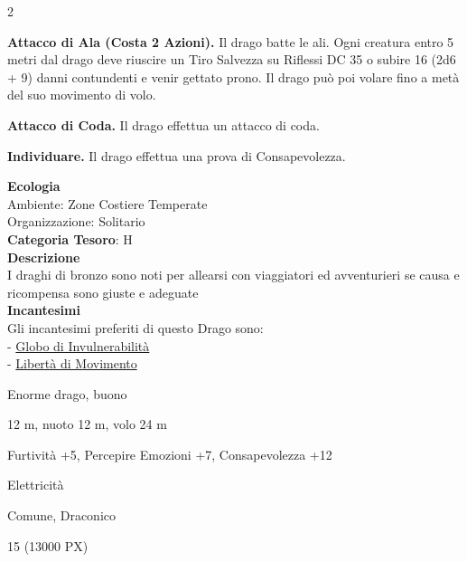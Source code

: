 \begin{multicols}{2}
{\textbf{Attacco di Ala (Costa 2 Azioni).} Il drago batte le ali. Ogni creatura entro 5 metri dal drago deve riuscire un Tiro Salvezza su Riflessi DC 35 o subire 16 (2d6 + 9) danni contundenti e venir gettato prono. Il drago può poi volare fino a metà del suo movimento di volo.

\textbf{Attacco di Coda.} Il drago effettua un attacco di coda.

\textbf{Individuare.} Il drago effettua una prova di Consapevolezza.

\textbf{Ecologia}\\
Ambiente: Zone Costiere Temperate\\
Organizzazione: Solitario\\
\textbf{Categoria Tesoro}: H\\
\textbf{Descrizione}\\
I draghi di bronzo sono noti per allearsi con viaggiatori ed avventurieri se causa e ricompensa sono giuste e adeguate\\
\textbf{Incantesimi}\\
Gli incantesimi preferiti di questo Drago sono:\\
- \hyperlink{Globo di Invulnerabilità}{Globo di Invulnerabilità}\\
- \hyperlink{Libertà di Movimento}{Libertà di Movimento}

\begin{description}[noitemsep, topsep=0pt, parsep=0pt, partopsep=0pt, itemsep=1pt, leftmargin=2.35cm,  labelwidth=2.2cm, itemindent=0cm, listparindent=0pt] %
\setlength{\baselineskip}{10pt}
\item[\textbf{Taglia/Tipo}] Enorme drago, buono
\item[\textbf{Caratt.}] 
\item[\textbf{Punti Ferita}] 
\item[\textbf{Movimento}] 12 m, nuoto 12 m, volo 24 m
\item[\textbf{Tiri Salvez.}] 
\item[\textbf{Comp.}] Furtività +5, Percepire Emozioni +7, Consapevolezza +12
\item[\textbf{Imm. Danni}] Elettricità
\item[\textbf{Sensi}] 
\item[\textbf{Linguaggi}] Comune, Draconico
\item[\textbf{Sfida}] 15 (13000 PX)
\end{description}
\smallskip

}
\end{multicols}
